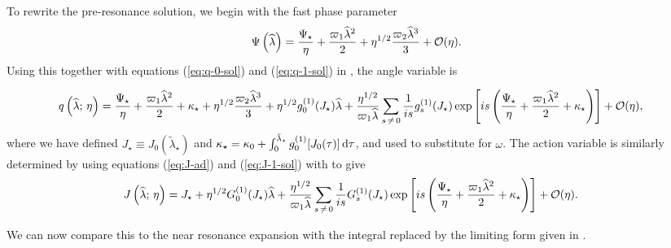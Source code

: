 To rewrite the pre-resonance solution, we begin with the fast phase parameter
\begin{equation}
\Psi\left(\widehat{\lambda}\right) = \dfrac{\Psi_\star}{\eta} + \dfrac{\varpi_1\widehat{\lambda}^2}{2} + \eta^{1/2}\dfrac{\varpi_2\widehat{\lambda}^3}{3} + \mathcal{O}({\eta}).
\end{equation}
Using this together with equations (\ref{eq:q-0-sol}) and (\ref{eq:q-1-sol}) in , the angle variable is
\begin{widetext}
\begin{align}
q\left(\widehat{\lambda};\,\eta\right) = {} & \dfrac{\Psi_\star}{\eta} + \dfrac{\varpi_1\widehat{\lambda}^2}{2} + \kappa_\star + \eta^{1/2}\dfrac{\varpi_2\widehat{\lambda}^3}{3} + \eta^{1/2}g_0^{(1)}(J_\star)\widehat{\lambda} + \dfrac{\eta^{1/2}}{\varpi_1\widehat{\lambda}}\sum_{s\,\neq\,0}\frac{1}{is}g_s^{(1)}(J_\star)\exp\left[is\left(\dfrac{\Psi_\star}{\eta} + \dfrac{\varpi_1\widehat{\lambda}^2}{2} + \kappa_\star\right)\right] + \mathcal{O}({\eta}),
\end{align}
where we have defined $J_\star \equiv J_0\left(\widetilde{\lambda}_\star\right)$ and $\kappa_\star = \kappa_0 + \int_{0}^{\tilde{\lambda}_\star}{g_0^{(1)}[J_0(\tau)]}\,\mathrm{d}{\tau}$, and used  to substitute for $\omega$. The action variable is similarly determined by using equations (\ref{eq:J-ad}) and (\ref{eq:J-1-sol}) with  to give
\begin{align}
J\left(\widehat{\lambda};\,\eta\right) = {} & J_\star + \eta^{1/2}G_0^{(1)}(J_\star)\widehat{\lambda} + \dfrac{\eta^{1/2}}{\varpi_1\widehat{\lambda}}\sum_{s\,\neq\,0}\frac{1}{is}G_s^{(1)}(J_\star)\exp\left[is\left(\dfrac{\Psi_\star}{\eta} + \dfrac{\varpi_1\widehat{\lambda}^2}{2} + \kappa_\star\right)\right] + \mathcal{O}({\eta}).
\end{align}
\end{widetext}
We can now compare this to the near resonance expansion with the integral replaced by the limiting form given in .

